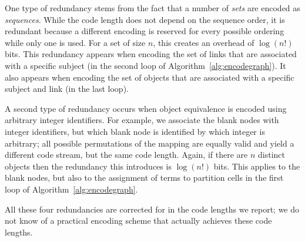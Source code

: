One type of redundancy stems from the fact that a number of
\emph{sets} are encoded as \emph{sequences}. While the code length
does not depend on the sequence order, it is redundant because a
different encoding is reserved for every possible ordering while only
one is used. For a set of size $n$, this creates an overhead of
$\log(n!)$ bits. This redundancy appears when encoding the set of
links that are associated with a specific subject (in the second loop
of Algorithm~\ref{alg:encodegraph}). It also appears when encoding the
set of objects that are associated with a specific subject and link
(in the last loop).

A second type of redundancy occurs when object equivalence is
encoded using arbitrary integer identifiers. For example, we associate
the blank nodes with integer identifiers, but which blank node is
identified by which integer is arbitrary; all possible permutations of
the mapping are equally valid and yield a different code stream, but
the same code length. Again, if there are $n$ distinct objects then the
redundancy this introduces is $\log(n!)$ bits. This applies to the
blank nodes, but also to the assignment of terms to partition cells in
the first loop of Algorithm~\ref{alg:encodegraph}.

All these four redundancies are corrected for in the code lengths we
report; we do not know of a practical encoding scheme that actually
achieves these code lengths.

